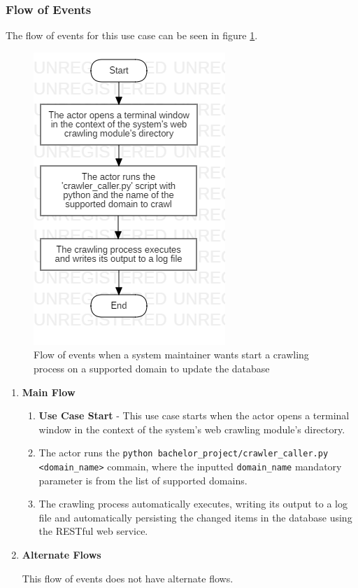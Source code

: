\documentclass[12pt,a4paper,twoside]{report}
\begin{document}
\subsubsection{Flow of Events}

The flow of events for this use case can be seen in figure \ref{fig:flow_crawl_update_database}.

\begin{figure}[ht]
  \centering
  \includegraphics[width=0.4\linewidth]{img/flow_crawl_update_database.png}
  \caption{Flow of events when a system maintainer wants start a crawling process on a supported domain to update the database}
  \label{fig:flow_crawl_update_database}
\end{figure}

\begin{enumerate}

\item \textbf{Main Flow}

  \begin{enumerate}
    \item \textbf{Use Case Start} - This use case starts when the actor opens a terminal window in the context of the system's web crawling module's directory.
    \item The actor runs the \lstinline$python bachelor_project/crawler_caller.py <domain_name>$ commain, where the inputted \lstinline$domain_name$ mandatory parameter is from the list of supported domains.
    \item The crawling process automatically executes, writing its output to a log file and automatically persisting the changed items in the database using the RESTful web service.
  \end{enumerate}


  \item \textbf{Alternate Flows}

  This flow of events does not have alternate flows.

\end{enumerate}
\end{document}
